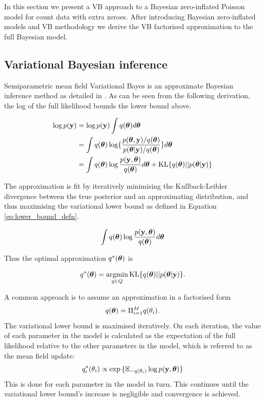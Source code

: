 \documentclass{article}[12pt]
\begin{document}
In this section we present a VB approach to a Bayesian zero-inflated Poisson model
for count data with extra zeroes. After introducing Bayesian zero-inflated models
and VB methodology we derive the VB factorised approximation to the full Bayesian
model. 

\subsection{Variational Bayesian inference}

Semiparametric mean field Variational Bayes is an approximate Bayesian inference method as detailed in
\cite{RohdeWand2015}. As can be seen from the following derivation, the log of the full likelihood bounds the 
lower bound above.

\begin{align*}
\log p(\vy) &= \log p(\vy) \int q(\vtheta) d \vtheta \\
&= \int q(\vtheta) \log \{ \frac{p(\vtheta, \vy) / q(\vtheta)}{p(\vtheta | \vy) / q(\vtheta)} \} d \vtheta \\
&= \int q(\vtheta) \log \frac{p(\vy, \vtheta)}{q(\vtheta)} d \vtheta +
	 \text{KL} \{ {q(\vtheta) || p(\vtheta|\vy)} \} %
\end{align*}

The approximation is fit by iteratively minimising the Kullback-Leibler divergence between the true 
posterior and an approximating distribution, and thus maximising the variational lower bound as defined in 
Equation \ref{eq:lower_bound_defn}.

\begin{equation}
\label{eq:lower_bound_defn}
\int q({\boldsymbol \theta}) \log \frac{p({\bf y}, {\boldsymbol \theta})}{q({\boldsymbol \theta})} d {\boldsymbol \theta}
\end{equation}

Thus the optimal approximation $q^*({\boldsymbol \theta})$ is

$$
q^*(\vtheta) = \argmin_{q \in Q} \text{KL} \{ {q(\vtheta) || p(\vtheta|\vy)} \}.
$$

A common approach is to assume an approximation in a factorised form
$$q({\boldsymbol \theta}) = \Pi_{i=1}^M q(\theta_i).$$
The variational lower bound is maximised iteratively. On each iteration, the value of each parameter in the
model is calculated as the expectation of the full likelihood relative to the other parameters in the model, 
which is referred to as the mean field update:
$$q_i^*(\theta_i) \propto \exp{\{ {\mathbb E}_{-q(\theta_i)} \log p({\bf y}, {\boldsymbol\theta}) \}}$$
This is done for each parameter in the model in turn.
This continues until the variational lower bound's increase is negligible and convergence is achieved.
\end{document}

